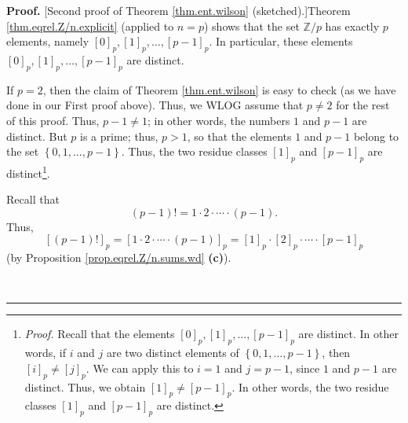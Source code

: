 \documentclass[numbers=enddot,12pt,final,onecolumn,notitlepage]{scrartcl}%
\numberwithin{exer}{subsection}
\theoremstyle{definition}
\newenvironment{proof}[1][Proof]{\noindent\textbf{#1.} }{\ \rule{0.5em}{0.5em}}
\begin{document}
\begin{proof}
[Second proof of Theorem \ref{thm.ent.wilson} (sketched).]Theorem
\ref{thm.eqrel.Z/n.explicit} (applied to $n=p$) shows that the set
$\mathbb{Z}/p$ has exactly $p$ elements, namely $\left[  0\right]
_{p},\left[  1\right]  _{p},\ldots,\left[  p-1\right]  _{p}$. In particular,
these elements $\left[  0\right]  _{p},\left[  1\right]  _{p},\ldots,\left[
p-1\right]  _{p}$ are distinct.

If $p=2$, then the claim of Theorem \ref{thm.ent.wilson} is easy to check (as
we have done in our First proof above). Thus, we WLOG assume that $p\neq2$ for
the rest of this proof. Thus, $p-1\neq1$; in other words, the numbers $1$ and
$p-1$ are distinct. But $p$ is a prime; thus, $p>1$, so that the elements $1$
and $p-1$ belong to the set $\left\{  0,1,\ldots,p-1\right\}  $. Thus, the two
residue classes $\left[  1\right]  _{p}$ and $\left[  p-1\right]  _{p}$ are
distinct\footnote{\textit{Proof.} Recall that the elements $\left[  0\right]
_{p},\left[  1\right]  _{p},\ldots,\left[  p-1\right]  _{p}$ are distinct. In
other words, if $i$ and $j$ are two distinct elements of $\left\{
0,1,\ldots,p-1\right\}  $, then $\left[  i\right]  _{p}\neq\left[  j\right]
_{p}$. We can apply this to $i=1$ and $j=p-1$, since $1$ and $p-1$ are
distinct. Thus, we obtain $\left[  1\right]  _{p}\neq\left[  p-1\right]  _{p}%
$. In other words, the two residue classes $\left[  1\right]  _{p}$ and
$\left[  p-1\right]  _{p}$ are distinct.}.

Recall that%
\[
\left(  p-1\right)  !=1\cdot2\cdot\cdots\cdot\left(  p-1\right)  .
\]
Thus,%
\[
\left[  \left(  p-1\right)  !\right]  _{p}=\left[  1\cdot2\cdot\cdots
\cdot\left(  p-1\right)  \right]  _{p}=\left[  1\right]  _{p}\cdot\left[
2\right]  _{p}\cdot\cdots\cdot\left[  p-1\right]  _{p}%
\]
(by Proposition \ref{prop.eqrel.Z/n.sums.wd} \textbf{(c)}).


\end{proof}
\end{document}
